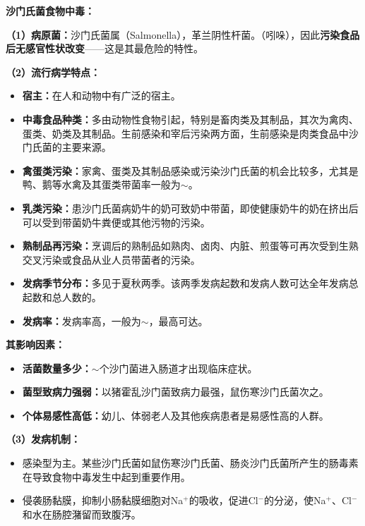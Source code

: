 \begin{keybox}
\textbf{沙门氏菌食物中毒：}

\textbf{（1）病原菌：}沙门氏菌属（Salmonella），革兰阴性杆菌。（吲哚），因此\textbf{污染食品后无感官性状改变}——这是其最危险的特性。

\textbf{（2）流行病学特点：}
\begin{itemize}[leftmargin=*]
    \item \textbf{宿主：}在人和动物中有广泛的宿主。
    \item \textbf{中毒食品种类：}多由动物性食物引起，特别是畜肉类及其制品，其次为禽肉、蛋类、奶类及其制品。生前感染和宰后污染两方面，生前感染是肉类食品中沙门氏菌的主要来源。
    \item \textbf{禽蛋类污染：}家禽、蛋类及其制品感染或污染沙门氏菌的机会比较多，尤其是鸭、鹅等水禽及其蛋类带菌率一般为$\sim$。
    \item \textbf{乳类污染：}患沙门氏菌病奶牛的奶可致奶中带菌，即使健康奶牛的奶在挤出后可以受到带菌奶牛粪便或其他污物的污染。
    \item \textbf{熟制品再污染：}烹调后的熟制品如熟肉、卤肉、内脏、煎蛋等可再次受到生熟交叉污染或食品从业人员带菌者的污染。
    \item \textbf{发病季节分布：}多见于夏秋两季。该两季发病起数和发病人数可达全年发病总起数和总人数的。
    \item \textbf{发病率：}发病率高，一般为$\sim$，最高可达。
\end{itemize}

\textbf{其影响因素：}
\begin{itemize}[leftmargin=*]
    \item \textbf{活菌数量多少：}$\sim$个沙门菌进入肠道才出现临床症状。
    \item \textbf{菌型致病力强弱：}以猪霍乱沙门菌致病力最强，鼠伤寒沙门氏菌次之。
    \item \textbf{个体易感性高低：}幼儿、体弱老人及其他疾病患者是易感性高的人群。
\end{itemize}

\textbf{（3）发病机制：}\difficulty
\begin{itemize}[leftmargin=*]
    \item 感染型为主。某些沙门氏菌如鼠伤寒沙门氏菌、肠炎沙门氏菌所产生的肠毒素在导致食物中毒发生中起到重要作用。
    \item 侵袭肠黏膜，抑制小肠黏膜细胞对Na$^+$的吸收，促进Cl$^-$的分泌，使Na$^+$、Cl$^-$和水在肠腔潴留而致腹泻。
\end{itemize}


\end{keybox}
